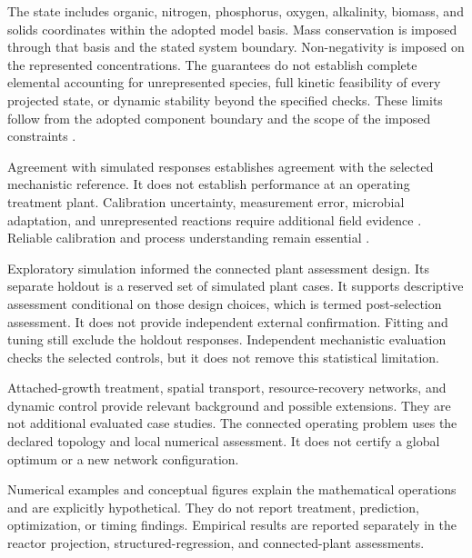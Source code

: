 The state includes organic, nitrogen, phosphorus, oxygen, alkalinity, biomass, and solids coordinates within the adopted model basis. Mass conservation is imposed through that basis and the stated system boundary. Non-negativity is imposed on the represented concentrations. The guarantees do not establish complete elemental accounting for unrepresented species, full kinetic feasibility of every projected state, or dynamic stability beyond the specified checks. These limits follow from the adopted component boundary and the scope of the imposed constraints \citep{TakacsVanrolleghem2006,Selerio2026}.

Agreement with simulated responses establishes agreement with the selected mechanistic reference. It does not establish performance at an operating treatment plant. Calibration uncertainty, measurement error, microbial adaptation, and unrepresented reactions require additional field evidence \citep{Machado2014,Newhart2019}. Reliable calibration and process understanding remain essential \citep{Petersen2003,Meijer2004}.

Exploratory simulation informed the connected plant assessment design. Its separate holdout is a reserved set of simulated plant cases. It supports descriptive assessment conditional on those design choices, which is termed post-selection assessment. It does not provide independent external confirmation. Fitting and tuning still exclude the holdout responses. Independent mechanistic evaluation checks the selected controls, but it does not remove this statistical limitation.

Attached-growth treatment, spatial transport, resource-recovery networks, and dynamic control provide relevant background and possible extensions. They are not additional evaluated case studies. The connected operating problem uses the declared topology and local numerical assessment. It does not certify a global optimum or a new network configuration.

Numerical examples and conceptual figures explain the mathematical operations and are explicitly hypothetical. They do not report treatment, prediction, optimization, or timing findings. Empirical results are reported separately in the reactor projection, structured-regression, and connected-plant assessments.
